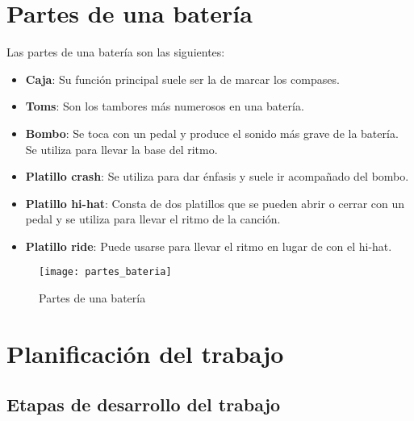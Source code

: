 
    \section{Partes de una batería} %
    \label{sec:PartesDeUnaBateria}

        Las partes de una batería son las siguientes:

        \begin{itemize}
            \item \textbf{Caja}: Su función principal suele ser la de marcar los compases.
            \item \textbf{Toms}: Son los tambores más numerosos en una batería.
            \item \textbf{Bombo}: Se toca con un pedal y produce el sonido más grave de la batería. Se utiliza para
            llevar la base del ritmo.
            \item \textbf{Platillo crash}: Se utiliza para dar énfasis y suele ir acompañado del bombo.
            \item \textbf{Platillo hi-hat}: Consta de dos platillos que se pueden abrir o cerrar con un pedal y se
            utiliza para llevar el ritmo de la canción.
            \item \textbf{Platillo ride}: Puede usarse para llevar el ritmo en lugar de con el hi-hat.
        \end{itemize}

        \newpage

        \begin{figure}[ht]
            \centering
            \texttt{[image: partes\_bateria]}
            \caption{Partes de una batería \cite{partes_bateria_fuente}\label{fig:PartesBateria}}
        \end{figure}


    \section{Planificación del trabajo} %
    \label{sec:PlanificacionDelTrabajo}

        \subsection{Etapas de desarrollo del trabajo} %
        \label{sub:EtapasDeDesarrolloDelTrabajo}

